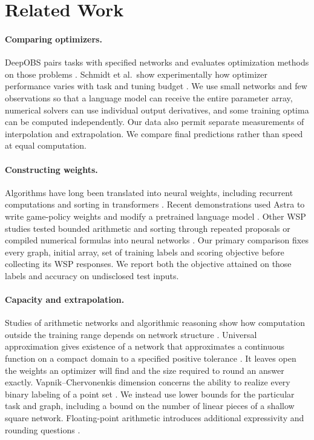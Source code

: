 \section{Related Work}
\paragraph{Comparing optimizers.} DeepOBS pairs tasks with specified networks and evaluates optimization methods on those problems \cite{schneider2019deepobs}. Schmidt et al.\ show experimentally how optimizer performance varies with task and tuning budget \cite{schmidt2021crowded}. We use small networks and few observations so that a language model can receive the entire parameter array, numerical solvers can use individual output derivatives, and some training optima can be computed independently. Our data also permit separate measurements of interpolation and extrapolation. We compare final predictions rather than speed at equal computation.

\paragraph{Constructing weights.} Algorithms have long been translated into neural weights, including recurrent computations \cite{siegelmann1994language,velez2026recurrent} and sorting in transformers \cite{lindner2023tracr}. Recent demonstrations used Astra to write game-policy weights and modify a pretrained language model \cite{takehi2026weightspace}. Other WSP studies tested bounded arithmetic and sorting through repeated proposals \cite{singh2026weightspace} or compiled numerical formulas into neural networks \cite{trimm2026benefits}. Our primary comparison fixes every graph, initial array, set of training labels and scoring objective before collecting its WSP responses. We report both the objective attained on those labels and accuracy on undisclosed test inputs.

\paragraph{Capacity and extrapolation.} Studies of arithmetic networks and algorithmic reasoning show how computation outside the training range depends on network structure \cite{trask2018nalu,madsen2020nau,xu2021extrapolation,velickovic2022clrs}. Universal approximation gives existence of a network that approximates a continuous function on a compact domain to a specified positive tolerance \cite{cybenko1989approximation,leshno1993approximation}. It leaves open the weights an optimizer will find and the size required to round an answer exactly. Vapnik--Chervonenkis dimension concerns the ability to realize every binary labeling of a point set \cite{bartlett2019vc}. We instead use lower bounds for the particular task and graph, including a bound on the number of linear pieces of a shallow square network. Floating-point arithmetic introduces additional expressivity and rounding questions \cite{park2024floating,hwang2025floating,park2026minimum,hwang2025robust}.

